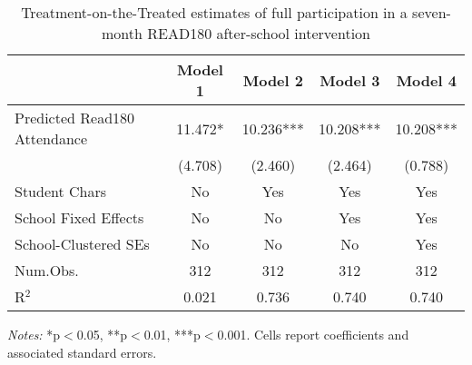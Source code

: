 \begin{table}

\caption{Treatment-on-the-Treated estimates of full participation in a seven-month READ180 after-school intervention \label{tab:tot}}
\centering
\begin{threeparttable}
\begin{tabular}[!htbp]{lcccc}
\toprule
  & Model 1 & Model 2 & Model 3 & Model 4\\
\midrule
Predicted Read180 Attendance & 11.472* & 10.236*** & 10.208*** & 10.208***\\
 & (4.708) & (2.460) & (2.464) & (0.788)\\
\midrule
Student Chars & No & Yes & Yes & Yes\\
School Fixed Effects & No & No & Yes & Yes\\
School-Clustered SEs & No & No & No & Yes\\
\midrule
Num.Obs. & 312 & 312 & 312 & 312\\
R$^{2}$ & 0.021 & 0.736 & 0.740 & 0.740 \\ 
\bottomrule
\end{tabular}
\begin{tablenotes}
\item \textit{Notes:} *p$<$0.05, **p$<$0.01, ***p$<$0.001. Cells report coefficients and associated standard errors.
\end{tablenotes}
\end{threeparttable}
\end{table}
